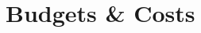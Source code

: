 \documentclass{ws-jai}
\begin{document}
\section{Budgets \& Costs}
\label{sec:cost}
%
%
%
%
%
%
%
\end{document}
